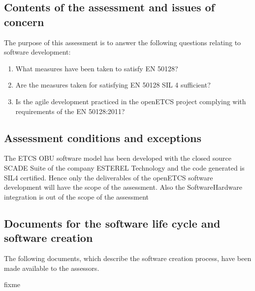 \bigskip

\subsection{Contents of the assessment and issues of concern}
\bigskip
The purpose of this assessment is to answer the following questions relating to software development:

\begin{enumerate}
	\item What measures have been taken to satisfy EN 50128?
	\item Are the measures taken for satisfying EN 50128 SIL 4 sufficient?
	\item Is the agile development practiced in the openETCS project complying with requirements of the EN 50128:2011?
\end{enumerate}
\bigskip

\subsection{Assessment conditions and exceptions}
\bigskip

The ETCS OBU software model has been developed with the closed source SCADE Suite of the company ESTEREL Technology and the code generated is SIL4 certified. Hence only the deliverables of the openETCS software development will have the scope of the
assessment. Also the SoftwareHardware integration is out of the scope of the assessment

\subsection{Documents for the software life cycle and software creation}
\bigskip
The following documents, which describe the software creation process, have been made available to the assessors.


\bigskip

{fixme}%

